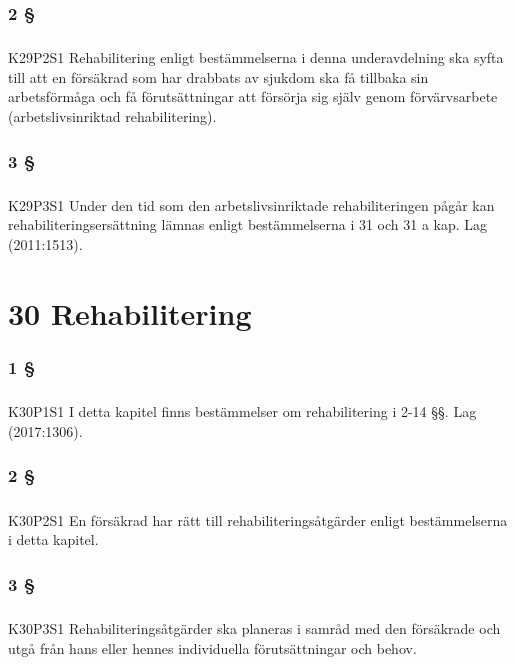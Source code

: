\documentclass[a4paper,notitlepage,openany,10pt]{book}
\begin{document}
\subsection*{2 §}
\paragraph*{}
{\tiny K29P2S1}
Rehabilitering enligt bestämmelserna i denna underavdelning ska syfta till att en försäkrad som har drabbats av sjukdom ska få tillbaka sin arbetsförmåga och få förutsättningar att försörja sig själv genom förvärvsarbete (arbetslivsinriktad rehabilitering).
\subsection*{3 §}
\paragraph*{}
{\tiny K29P3S1}
Under den tid som den arbetslivsinriktade rehabiliteringen pågår kan rehabiliteringsersättning lämnas enligt bestämmelserna i 31 och 31 a kap.
Lag (2011:1513).
\chapter*{30 Rehabilitering}
\subsection*{1 §}
\paragraph*{}
{\tiny K30P1S1}
I detta kapitel finns bestämmelser om rehabilitering i 2-14 §§.
Lag (2017:1306).
\subsection*{2 §}
\paragraph*{}
{\tiny K30P2S1}
En försäkrad har rätt till rehabiliteringsåtgärder enligt bestämmelserna i detta kapitel.
\subsection*{3 §}
\paragraph*{}
{\tiny K30P3S1}
Rehabiliteringsåtgärder ska planeras i samråd med den försäkrade och utgå från hans eller hennes individuella förutsättningar och behov.
\end{document}
